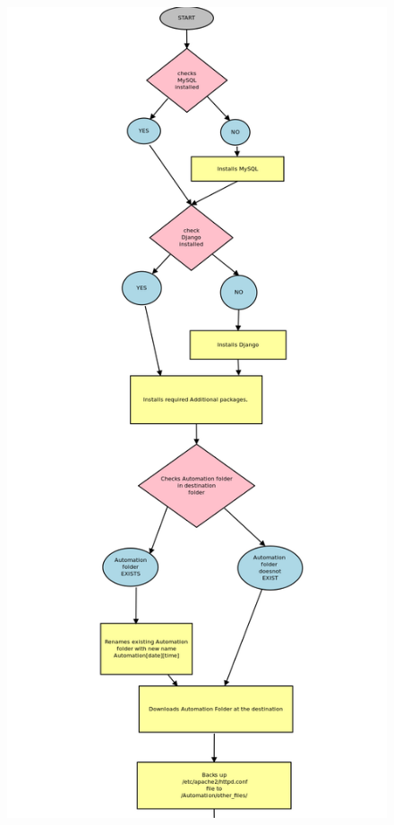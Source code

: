 \newpage
\begin{figure}[h]
\centering \includegraphics[scale=0.27]{inst1.png}
\end{figure}
\newpage
